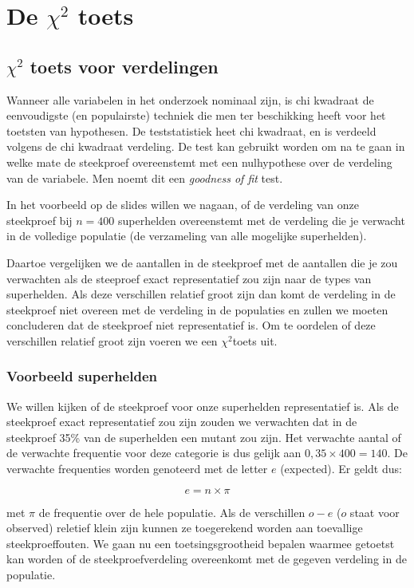 \chapter{De \texorpdfstring{$\chi^{2}$}{Chi-kwadraat} toets}
\label{ch:chikwadraat}

\section{\texorpdfstring{$\chi^{2}$}{Chi-kwadraat} toets voor verdelingen}

Wanneer alle variabelen in het onderzoek nominaal zijn, is chi kwadraat de eenvoudigste (en populairste) techniek die men ter beschikking heeft voor het toetsten van hypothesen. De teststatistiek heet chi kwadraat, en is verdeeld volgens de chi kwadraat verdeling. De test kan gebruikt worden om na te gaan in welke mate de steekproef overeenstemt met een nulhypothese over de verdeling van de variabele. Men noemt dit een \textit{goodness of fit}  test.

In het voorbeeld op de slides willen we nagaan, of de verdeling van onze steekproef bij $n = 400$ superhelden overeenstemt met de verdeling die je verwacht in de volledige populatie (de verzameling van alle mogelijke superhelden). 

Daartoe vergelijken we de aantallen in de steekproef met de aantallen die je zou verwachten als de steeproef exact representatief zou zijn naar de types van superhelden. Als deze verschillen relatief groot zijn dan komt de verdeling in de steekproef niet overeen met de verdeling in de populaties en zullen we moeten concluderen dat de steekproef niet representatief is. Om te oordelen of deze verschillen relatief groot zijn voeren we een $\chi^{2}$toets uit. 


\subsection{Voorbeeld superhelden}
We willen kijken of de steekproef voor onze superhelden representatief is. Als de steekproef exact representatief zou zijn zouden we verwachten dat in de steekproef 35\% van de superhelden een mutant zou zijn. Het verwachte aantal of de verwachte frequentie voor deze categorie is dus gelijk aan $0,35 \times 400 = 140$. De verwachte frequenties worden genoteerd met de letter $e$ (expected). Er geldt dus:

\[ e = n \times \pi \]

met $\pi$ de frequentie over de hele populatie. Als de verschillen $o - e$ ($o$ staat voor observed) reletief klein zijn kunnen ze toegerekend worden aan toevallige steekproeffouten. We gaan nu een toetsingsgrootheid bepalen waarmee getoetst kan worden of de steekproefverdeling overeenkomt met de gegeven verdeling in de populatie.

